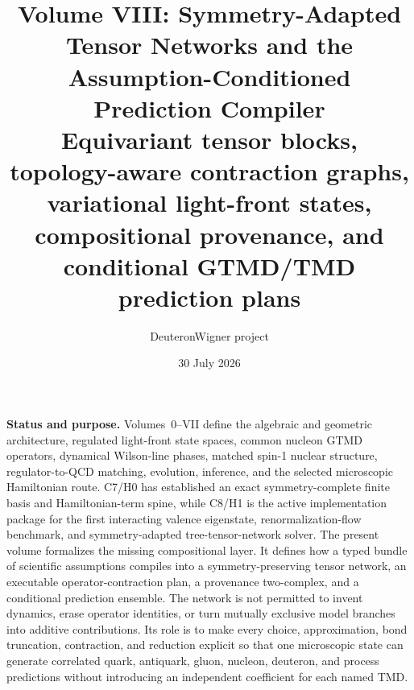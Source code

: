 \documentclass[11pt]{article}
\title{\vspace{-1.0cm}
{\color{navy}\bfseries Volume VIII: Symmetry-Adapted Tensor Networks and the\\[2mm]
Assumption-Conditioned Prediction Compiler}\\[4mm]
\large Equivariant tensor blocks, topology-aware contraction graphs, variational light-front states,\\
compositional provenance, and conditional GTMD/TMD prediction plans}
\author{DeuteronWigner project}
\date{30 July 2026}
\begin{document}
\maketitle

\begin{center}
\begin{minipage}{0.94\textwidth}
\colorbox{softblue}{\parbox{0.96\textwidth}{
\textbf{Status and purpose.}
Volumes~0--VII define the algebraic and geometric architecture, regulated
light-front state spaces, common nucleon GTMD operators, dynamical Wilson-line
phases, matched spin-1 nuclear structure, regulator-to-QCD matching,
evolution, inference, and the selected microscopic Hamiltonian route.  C7/H0
has established an exact symmetry-complete finite basis and Hamiltonian-term
spine, while C8/H1 is the active implementation package for the first
interacting valence eigenstate, renormalization-flow benchmark, and
symmetry-adapted tree-tensor-network solver.  The present volume formalizes the
missing compositional layer.  It defines how a typed bundle of scientific
assumptions compiles into a symmetry-preserving tensor network, an executable
operator-contraction plan, a provenance two-complex, and a conditional
prediction ensemble.  The network is not permitted to invent dynamics, erase
operator identities, or turn mutually exclusive model branches into additive
contributions.  Its role is to make every choice, approximation, bond
truncation, contraction, and reduction explicit so that one microscopic state
can generate correlated quark, antiquark, gluon, nucleon, deuteron, and process
predictions without introducing an independent coefficient for each named
TMD.
}}
\end{minipage}
\end{center}
\end{document}
